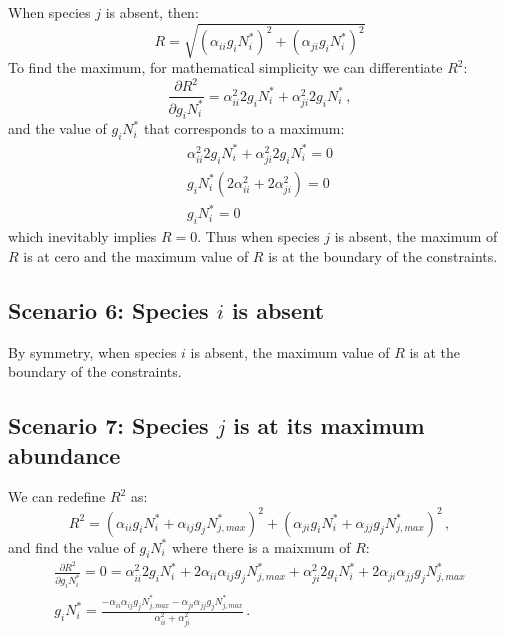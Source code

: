 \begin{refsection}
When species $j$ is absent, then:
\begin{equation}
  R = \sqrt{ (\alpha_{ii}g_{i}N_{i}^{*})^{2} + (\alpha_{ji}g_{i}N_{i}^{*})^{2}  }
\end{equation}
To find the maximum, for mathematical simplicity we can differentiate $R^{2}$:
\begin{equation}
  \frac{\partial R^{2}}{\partial g_{i}N_{i}^{*}} = \alpha_{ii}^{2}2g_{i}N_{i}^{*} + \alpha_{ji}^{2}2g_{i}N_{i}^{*} \,,
\end{equation}
and the value of $g_{i}N_{i}^{*}$ that corresponds to a maximum:
\begin{eqnarray}
  \alpha_{ii}^{2}2g_{i}N_{i}^{*} + \alpha_{ji}^{2}2g_{i}N_{i}^{*}  = 0 \\
  g_{i}N_{i}^{*} (2\alpha_{ii}^{2} +  2\alpha_{ji}^{2}) = 0 \\
  g_{i}N_{i}^{*}= 0
\end{eqnarray}
which inevitably implies $R = 0$. Thus when species $j$ is absent, the maximum of $R$ is at cero and the maximum value of $R$ is at the boundary of the constraints.



\subsection*{Scenario 6: Species $i$ is absent }
By symmetry, when species $i$ is absent, the maximum value of $R$ is  at the boundary of the constraints.

\subsection*{Scenario 7: Species $j$ is at its maximum abundance }
We can redefine $R^{2}$ as:
\begin{equation}
   R^2 = (\alpha_{ii}g_{i}N_{i}^{*} + \alpha_{ij}g_{j}N_{j,max}^{*} )^2 + (\alpha_{ji}g_{i}N_{i}^{*} + \alpha_{jj}g_{j}N_{j,max}^{*} )^2 \,,
\end{equation}
and find the value of $g_{i}N_{i}^{*}$ where there is a maixmum of $R$:
\begin{eqnarray}
  \frac{\partial R^{2}}{\partial g_{i}N_{i}^{*}}= 0 = \alpha_{ii}^{2}2g_{i}N_{i}^{*}  +2\alpha_{ii}\alpha_{ij}g_{j}N_{j,max}^{*} +  \alpha_{ji}^{2}2g_{i}N_{i}^{*} + 2\alpha_{ji}\alpha_{jj}g_{j}N_{j,max}^{*}\\
  g_{i}N_{i}^{*} = \frac{- \alpha_{ii}\alpha_{ij}g_{j}N_{j,max}^{*} - \alpha_{ji}\alpha_{jj}g_{j}N_{j,max}^{*}}{\alpha_{ii}^2 + \alpha_{ji}^2} \,.
\end{eqnarray}


\end{refsection}
